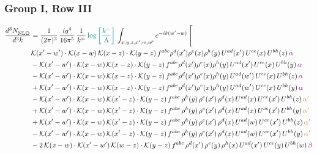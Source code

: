 \documentclass[9pt]{article}
\numberwithin{equation}{section}
\begin{document}
\subsubsection{Group I, Row III}
\begin{align}
    \frac{d^{3}N_{\rm NLO}^{\rm}}{d^{3}k}  & = \frac{1}{(2\pi)^{3}}\, \frac{ig^{4}}{16\pi^{5}}\, \frac{1}{k^{+}}\, {\color{teal}\log{\left[\frac{k^{+}}{\Lambda}\right]}}\, \int_{x,y,z,x^{\prime},w,w^{\prime}}e^{-ik(w^{\prime}-w)}\, \Bigg[\notag \\ & \mathcal{K}(x'-w')\cdot \mathcal{K}(x-w)\, \mathcal{K}(x-z)\cdot \mathcal{K}(y-z)\, f^{abc}\rho^{d}(x')\rho^{e}(x)\rho^{h}(y)\, U^{ad}(x')\,U^{ce}(x)\, U^{bh}(z)\,{\color{violet} \alpha}\notag\\ & - \mathcal{K}(x'-w')\cdot \mathcal{K}(x-w)\, \mathcal{K}(x-z)\cdot \mathcal{K}(y-z)\, f^{abc}\rho^{d}(x')\rho^{e}(x)\rho^{h}(y)\, U^{ad}(x')\,U^{ce}(x)\, U^{bh}(y)\,{\color{violet} \alpha}\notag \\ &-\mathcal{K}(x'-w')\cdot \mathcal{K}(x-w)\, \mathcal{K}(x-z)\cdot \mathcal{K}(y-z)\, f^{abc}\rho^{d}(x')\rho^{e}(x)\rho^{h}(y)\, U^{ad}(w')\,U^{ce}(x)\, U^{bh}(z)\,{\color{violet} \alpha}\notag \\ & +\mathcal{K}(x'-w')\cdot \mathcal{K}(x-w)\, \mathcal{K}(x-z)\cdot \mathcal{K}(y-z)\, f^{abc}\rho^{d}(x')\rho^{e}(x)\rho^{h}(y)\, U^{ad}(w')\,U^{ce}(x)\, U^{bh}(y)\,{\color{violet} \alpha}\notag \\ & -\mathcal{K}(x'-w')\cdot\mathcal{K}(x-w)\,\mathcal{K}(x'-z)\cdot\mathcal{K}(y-z)\, f^{abc}\,\rho^{h}(y)\,\rho^{e}(x')\,\rho^{d}(x)\,U^{ad}(x)\,U^{ce}(x')\,U^{bh}(z)\,{\color{brown} \alpha'}\notag \\ &+\mathcal{K}(x'-w')\cdot\mathcal{K}(x-w)\,\mathcal{K}(x'-z)\cdot\mathcal{K}(y-z)\, f^{abc}\,\rho^{h}(y)\,\rho^{e}(x')\,\rho^{d}(x)\,U^{ad}(x)\,U^{ce}(x')\,U^{bh}(y)\,{\color{brown} \alpha'}\notag \\ & +\mathcal{K}(x'-w')\cdot\mathcal{K}(x-w)\,\mathcal{K}(x'-z)\cdot\mathcal{K}(y-z)\, f^{abc}\,\rho^{h}(y)\,\rho^{e}(x')\,\rho^{d}(x)\,U^{ad}(w)\,U^{ce}(x')\,U^{bh}(z)\,{\color{brown} \alpha'}\notag \\ & -\mathcal{K}(x'-w')\cdot\mathcal{K}(x-w)\,\mathcal{K}(x'-z)\cdot\mathcal{K}(y-z)\, f^{abc}\,\rho^{h}(y)\,\rho^{e}(x')\,\rho^{d}(x)\,U^{ad}(w)\,U^{ce}(x')\,U^{bh}(y)\,{\color{brown} \alpha'}\notag \\ & -2\,\mathcal{K}(x-w)\cdot\mathcal{K}(x'-w')\,\mathcal{K}(w-z)\cdot\mathcal{K}(y-z)\, f^{abc}\,\rho^{d}(x')\,\rho^{e}(y)\,\rho^{h}(x)\,U^{ad}(x')\,U^{ce}(y)\,U^{bh}(w)\,{\color{violet} \beta}\notag\\

\end{align}
\end{document}
